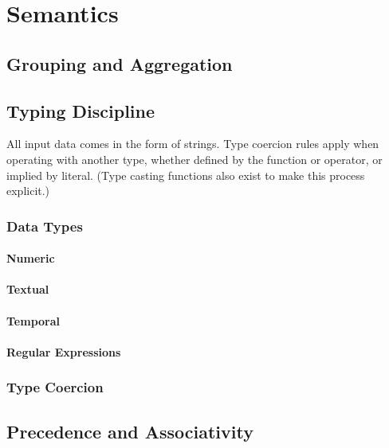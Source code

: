 % 
% 
% 
% 
% 

\section{Semantics}

\subsection{Grouping and Aggregation}

\subsection{Typing Discipline}

All input data comes in the form of strings. Type coercion rules apply
when operating with another type, whether defined by the function or
operator, or implied by literal. (Type casting functions also exist to
make this process explicit.)

\subsubsection{Data Types}

\paragraph{Numeric}

\paragraph{Textual}

\paragraph{Temporal}

\paragraph{Regular Expressions}

\subsubsection{Type Coercion}

\subsection{Precedence and Associativity}

